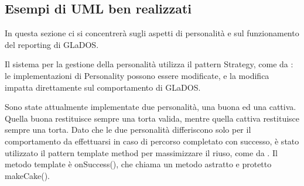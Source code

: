 \documentclass[a4paper,12pt]{report}
\begin{document}


\subsection*{Esempi di UML ben realizzati}

In questa sezione ci si concentrerà sugli aspetti di personalità e sul funzionamento del reporting di GLaDOS.

Il sistema per la gestione della personalità utilizza il pattern Strategy, come da : le implementazioni di Personality possono essere modificate, e la modifica impatta direttamente sul comportamento di GLaDOS.


Sono state attualmente implementate due personalità, una buona ed una cattiva.
Quella buona restituisce sempre una torta valida, mentre quella cattiva restituisce sempre una torta.
Dato che le due personalità differiscono solo per il comportamento da effettuarsi in caso di percorso completato con successo, è stato utilizzato il pattern template method per massimizzare il riuso, come da .
Il metodo template è onSuccess(), che chiama un metodo astratto e protetto makeCake().
\end{document}
